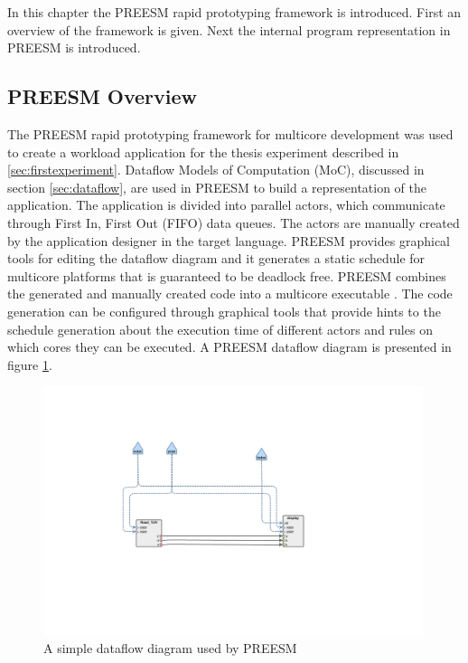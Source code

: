 In this chapter the PREESM rapid prototyping framework is introduced. First an overview of the framework is given. Next the internal program representation in PREESM is introduced.

\subsection{PREESM Overview}
\label{sec:preesmover}
The PREESM rapid prototyping framework for multicore development was used to create a workload application for the thesis experiment described in \ref{sec:firstexperiment}. Dataflow Models of Computation (MoC), discussed in section \ref{sec:dataflow}, are used in PREESM to build a representation of the application. The application is divided into parallel actors, which communicate through First In, First Out (FIFO) data queues. The actors are manually created by the application designer in the target language. PREESM provides graphical tools for editing the dataflow diagram and it generates a static schedule for multicore platforms that is guaranteed to be deadlock free. PREESM combines the generated and manually created code into a multicore executable \cite{pelcat2014preesm}. The code generation can be configured through graphical tools that provide hints to the schedule generation about the execution time of different actors and rules on which cores they can be executed. A PREESM dataflow diagram is presented in figure \ref{fig:preesm_example}.

\begin{figure}[h!]
    \begin{center}
        \includegraphics[width=0.99\textwidth]{images/example_preesm_diagram.png}
        \caption{A simple dataflow diagram used by PREESM }
        \label{fig:preesm_example}
    \end{center}
\end{figure}

